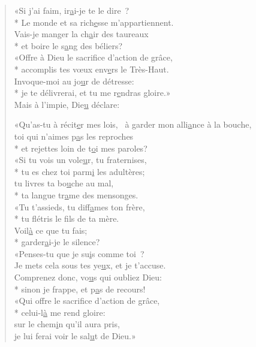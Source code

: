 \begin{verse}
«Si j’ai faim, ir\underline{a}i-je te le dire ? \\*
Le monde et sa rich\underline{e}sse m’appartiennent. \\
Vais-je manger la ch\underline{a}ir des taureaux \\*
et boire le s\underline{a}ng des béliers? \\

«Offre à Dieu le sacrif\underline{i}ce d’action de grâce, \\*
accomplis tes vœux env\underline{e}rs le Très-Haut. \\
Invoque-moi au jo\underline{u}r de détresse: \\*
je te délivrerai, et tu me r\underline{e}ndras gloire.» \\

Mais à l’impie, Die\underline{u} déclare:~\psalmdagger

«Qu’as-tu à récit\underline{e}r mes lois,~\psalmstar
à garder mon alli\underline{a}nce à la bouche, \\
toi qui n’aimes p\underline{a}s les reproches \\*
et rejettes loin de t\underline{o}i mes paroles? \\

«Si tu vois un vole\underline{u}r, tu fraternises, \\*
tu es chez toi parm\underline{i} les adultères; \\
tu livres ta bo\underline{u}che au mal, \\*
ta langue tr\underline{a}me des mensonges. \\

«Tu t’assieds, tu diff\underline{a}mes ton frère, \\*
tu flétris le f\underline{i}ls de ta mère. \\
Voil\underline{à} ce que tu fais; \\*
garder\underline{a}i-je le silence? \\

«Penses-tu que je su\underline{i}s comme toi ? \\
Je mets cela sous tes ye\underline{u}x, et je t’accuse. \\
Comprenez donc, vo\underline{u}s qui oubliez Dieu: \\*
sinon je frappe, et p\underline{a}s de recours! \\

«Qui offre le sacrif\underline{i}ce d’action de grâce, \\*
celui-l\underline{à} me rend gloire: \\
sur le chem\underline{i}n qu’il aura pris, \\
je lui ferai voir le sal\underline{u}t de Dieu.» \\
\end{verse}

